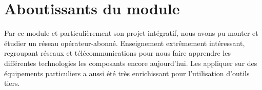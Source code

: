 \section{Aboutissants du module}

Par ce module et particulièrement son projet intégratif, nous avons pu monter et étudier un réseau opérateur-abonné. Enseignement extrêmement intéressant, regroupant réseaux et télécommunications pour nous faire apprendre les différentes technologies les composants encore aujourd'hui. Les appliquer sur des équipements particuliers a aussi été très enrichissant pour l'utilisation d'outils tiers.